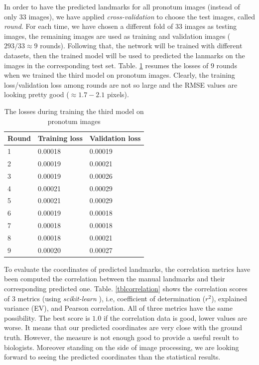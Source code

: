 \documentclass[review]{elsarticle}
\begin{document}
In order to have the predicted landmarks for all pronotum images (instead of only $33$ images), we have applied \textit{cross-validation} to choose the test images, called \textit{round}. For each time, we have chosen a different fold of $33$ images as testing images, the remaining images are used as training and validation images ($293/33 \approx 9$ rounds). Following that, the network will be trained with different datasets, then the trained model will be used to predicted the lanmarks on the images in the corresponding test set. Table. \ref{tbltrainingloss} resumes the losses of $9$ rounds when we trained the third model on pronotum images. Clearly, the training loss/validation loss among rounds are not so large and the RMSE values are looking pretty good ($\approx 1.7 - 2.1$ pixels).

\begin{table}[h!]
	\centering
	\begin{tabular}{l l l}
	Round & Training loss & Validation loss \\ \hline
	1 & 0.00018 & 0.00019  \\ \hline
	2 & 0.00019 & 0.00021 \\ \hline
	3 & 0.00019 & 0.00026 \\ \hline
	4 & 0.00021 & 0.00029 \\ \hline
	5 & 0.00021 & 0.00029 \\ \hline
	6 & 0.00019 & 0.00018 \\ \hline
	7 & 0.00018 & 0.00018 \\ \hline
	8 & 0.00018 & 0.00021 \\ \hline
	9 & 0.00020 & 0.00027 \\ \hline
	\end{tabular}
	\caption{\small{The losses during training the third model on pronotum images}}
	\label{tbltrainingloss}
\end{table}

To evaluate the coordinates of predicted landmarks, the correlation metrics have been computed the correlation between the manual landmarks and their corresponding predicted one. Table. \ref{tblcorrelation} shows the correlation scores of $3$ metrics (using \textit{scikit-learn} \cite{pedregosa2011scikit}), i.e, coefficient of determination ($r^2$), explained variance (EV), and Pearson correlation. All of three metrics have the same possibility. The best score is $1.0$ if the correlation data is good, lower values are worse. It means that our predicted coordinates are very close with the ground truth. However, the measure is not enough good to provide a useful result to biologists. Moreover standing on the side of image processing, we are looking forward to  seeing the predicted coordinates than the statistical results.
\end{document}
